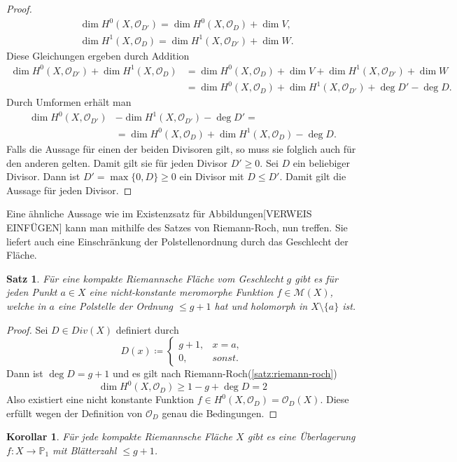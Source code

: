 \documentclass[11pt,a4paper,toc=bibliography]{scrartcl}
\theoremstyle{thm}
\newtheorem{satz}{Satz}[section]
\newtheorem{koro}{Korollar}[section]
\theoremstyle{def}
\theoremstyle{remark}
\begin{document}
\begin{proof}
\begin{align*}
&\dim H^0(X,\mathcal{O}_{D'})=\dim H^0(X,\mathcal{O}_D)+\dim V,\\
&\dim H^1(X,\mathcal{O}_D)=\dim H^1(X,\mathcal{O}_{D'})+\dim W.
\end{align*}
Diese Gleichungen ergeben durch Addition
\begin{align*}
	\dim H^0(X,\mathcal{O}_{D'})+\dim H^1(X,\mathcal{O}_D) &=\dim H^0(X,\mathcal{O}_D)+\dim V+\dim H^1(X,\mathcal{O}_{D'})+\dim W\\
	&=\dim H^0(X,\mathcal{O}_D)+\dim H^1(X,\mathcal{O}_{D'})+\deg D'-\deg D.
\end{align*}
Durch Umformen erhält man
\begin{align*}
\dim H^0(X,\mathcal{O}_{D'})&-\dim H^1(X,\mathcal{O}_{D'})-\deg D'=\\
							&=\dim H^0(X,\mathcal{O}_D)+\dim H^1(X,\mathcal{O}_D)-\deg D.	
\end{align*}
Falls die Aussage für einen der beiden Divisoren gilt, so muss sie folglich auch für den anderen gelten. Damit gilt sie für jeden Divisor $D'\geq 0$. Sei $D$ ein beliebiger Divisor. Dann ist $D'=\max \{0,D\}\geq 0$ ein Divisor mit $D\leq D'$. Damit gilt die Aussage für jeden Divisor.
\end{proof}
Eine ähnliche Aussage wie im Existenzsatz für Abbildungen[VERWEIS EINFÜGEN] kann man mithilfe des Satzes von Riemann-Roch, nun treffen. Sie liefert auch eine Einschränkung der Polstellenordnung durch das Geschlecht der Fläche.
\begin{satz}
	Für eine kompakte Riemannsche Fläche vom Geschlecht $g$ gibt es für jeden Punkt $a\in X$ eine nicht-konstante meromorphe Funktion $f\in \mathcal{M}(X)$, welche in $a$ eine Polstelle der Ordnung $\leq g+1$ hat und holomorph in $X\setminus\{a\}$ ist.
\end{satz} 
\begin{proof}
	Sei $D\in Div(X)$ definiert durch
	\[
		D(x)\coloneqq
	\begin{cases}
		g+1, &x=a,\\
		0, &sonst.
	\end{cases}
	\]
	Dann ist $\deg D = g+1$ und es gilt nach Riemann-Roch(\ref{satz:riemann-roch})
	\[
	\dim H^0(X,\mathcal{O}_D)\geq 1-g+\deg D=2 
	\]
	Also existiert eine nicht konstante Funktion $f\in H^0(X,\mathcal{O}_D)=\mathcal{O}_D(X)$. Diese erfüllt wegen der Definition von $\mathcal{O}_D$ genau die Bedingungen.
\end{proof}
\begin{koro}
	Für jede kompakte Riemannsche Fläche $X$ gibt es eine Überlagerung $f:X\rightarrow \mathbb{P}_1$ mit Blätterzahl $\leq g+1$.
	\end{koro}
\end{document}
